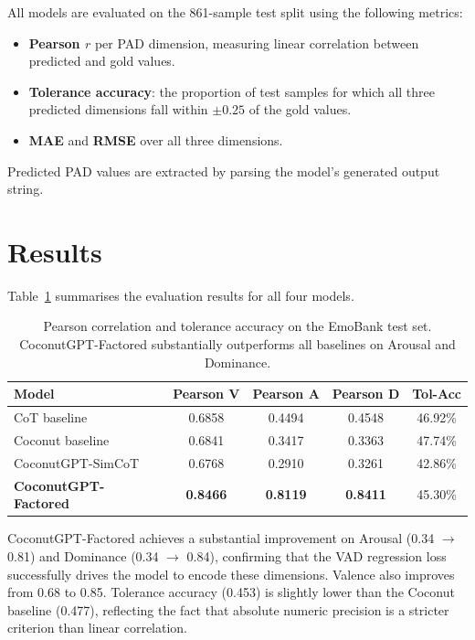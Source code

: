 All models are evaluated on the 861-sample test split using the following metrics:

\begin{itemize}
    \item \textbf{Pearson $r$} per PAD dimension, measuring linear correlation between predicted and gold values.
    \item \textbf{Tolerance accuracy}: the proportion of test samples for which all three predicted dimensions fall within $\pm 0.25$ of the gold values.
    \item \textbf{MAE} and \textbf{RMSE} over all three dimensions.
\end{itemize}

Predicted PAD values are extracted by parsing the model's generated output string.

\section{Results}

Table~\ref{tab:main_results} summarises the evaluation results for all four models.

\begin{table}[H]
\centering
\begin{tabular}{lcccc}
\toprule
\textbf{Model} & \textbf{Pearson V} & \textbf{Pearson A} & \textbf{Pearson D} & \textbf{Tol-Acc} \\
\midrule
CoT baseline             & 0.6858 & 0.4494 & 0.4548 & 46.92\% \\
Coconut baseline         & 0.6841 & 0.3417 & 0.3363 & 47.74\% \\
CoconutGPT-SimCoT        & 0.6768 & 0.2910 & 0.3261 & 42.86\% \\
\textbf{CoconutGPT-Factored} & \textbf{0.8466} & \textbf{0.8119} & \textbf{0.8411} & 45.30\% \\
\bottomrule
\end{tabular}
\caption{Pearson correlation and tolerance accuracy on the EmoBank test set. CoconutGPT-Factored substantially outperforms all baselines on Arousal and Dominance.}
\label{tab:main_results}
\end{table}

CoconutGPT-Factored achieves a substantial improvement on Arousal (0.34 $\to$ 0.81) and Dominance (0.34 $\to$ 0.84), confirming that the VAD regression loss successfully drives the model to encode these dimensions.
Valence also improves from 0.68 to 0.85.
Tolerance accuracy (0.453) is slightly lower than the Coconut baseline (0.477), reflecting the fact that absolute numeric precision is a stricter criterion than linear correlation.

